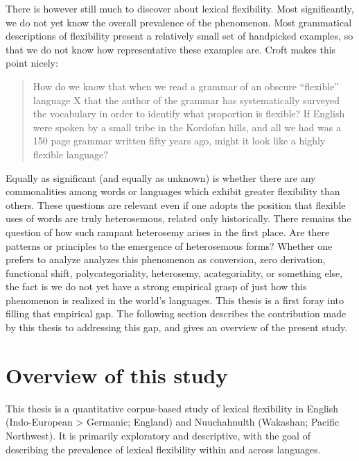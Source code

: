 There is however still much to discover about lexical flexibility. Most significantly, we do not yet know the overall prevalence of the phenomenon. Most grammatical descriptions of flexibility present a relatively small set of handpicked examples, so that we do not know how representative these examples are. Croft  makes this point nicely:

\blockquote[]{How do we know that when we read a grammar of an obscure \enquote{flexible} language X that the author of the grammar has systematically surveyed the vocabulary in order to identify what proportion is flexible? If English were spoken by a small tribe in the Kordofan hills, and all we had was a 150 page grammar written fifty years ago, might it look like a highly flexible language?}

\noindent Equally as significant (and equally as unknown) is whether there are any commonalities among words or languages which exhibit greater flexibility than others. These questions are relevant even if one adopts the position that flexible uses of words are truly heterosemous, related only historically. There remains the question of how such rampant heterosemy arises in the first place. Are there patterns or principles to the emergence of heterosemous forms? Whether one prefers to analyze analyzes this phenomenon as conversion, zero derivation, functional shift, polycategoriality, heterosemy, acategoriality, or something else, the fact is we do not yet have a strong empirical grasp of just how this phenomenon is realized in the world's languages. This thesis is a first foray into filling that empirical gap. The following section describes the contribution made by this thesis to addressing this gap, and gives an overview of the present study.

\section{Overview of this study}

This thesis is a quantitative corpus-based study of lexical flexibility in English (Indo-European > Germanic; England) and Nuuchahnulth (Wakashan; Pacific Northwest). It is primarily exploratory and descriptive, with the goal of describing the prevalence of lexical flexibility within and across languages.
